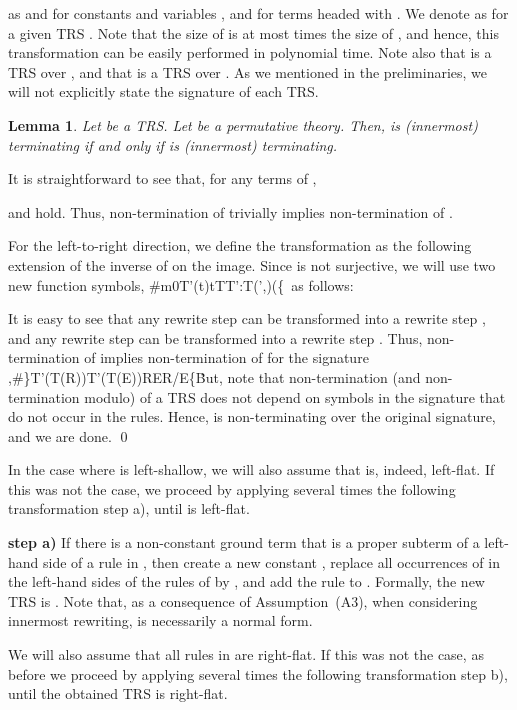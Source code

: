 \documentclass{LMCS}
\theoremstyle{plain}
\newtheorem{lemma}[thm]{Lemma}
\def\Tau{{\mathcal T}}
\begin{document}
as  and  for constants  and variables ,
and 
for terms headed with .
We denote  as 
for a given TRS .
Note that the size of  is at most  times the
size of , and hence, this transformation can be
easily performed in polynomial time.
Note also that  is a TRS over , and that 
is a TRS over . As we mentioned in the preliminaries,
we will not explicitly state the signature of each TRS.

\begin{lemma}\label{lemma-simplifying1}
Let  be a TRS. Let  be a permutative theory.
Then,  is (innermost) terminating if and only if 
is (innermost) terminating.
\end{lemma}

\proof
It is straightforward to see that, for any terms 
of ,

and  hold.
Thus, non-termination of  trivially implies non-termination
of .

For the left-to-right direction,
we define the 
transformation  as the following extension of the inverse of 
on the image. 
Since  is not surjective, we will use two new function symbols,
\#m0T'(t)tTT':\Tau(\Sigma',\X)\rightarrow \Tau(\Sigma\cup\{\
as follows:


It is easy to see that any rewrite step
 can be transformed into
a rewrite step ,
and any rewrite step
 can be transformed into
a rewrite step .
Thus, non-termination of  implies non-termination
of  for the signature
,\#\}T'(T(R))T'(T(E))RER/E\Sigma\cup\{\. But, note that
non-termination (and non-termination modulo) of a TRS
does not depend on symbols in the signature that
do not occur in the rules. Hence,  is non-terminating
over the original signature, and we are done.
\qed


In the case where  is left-shallow, we will also assume
that  is, indeed, left-flat. If this was not the case,
we proceed by applying several times the following
transformation step a), until  is left-flat.

\medskip

\noindent
{\bf step a)} If there is a non-constant ground term  that is
a proper subterm of a left-hand side of a rule in , then create
a new constant , replace all occurrences of  in
the left-hand sides of the rules of  by , and add the
rule  to . Formally,
the new TRS  is
.
Note that, as a consequence of Assumption~(A3),
when considering innermost rewriting,  is
necessarily a normal form.

\medskip

We will also assume that all rules in  are right-flat.
If this was not the case, as before
we proceed by applying several times the following
transformation step b), until the obtained TRS is right-flat.
\end{document}
